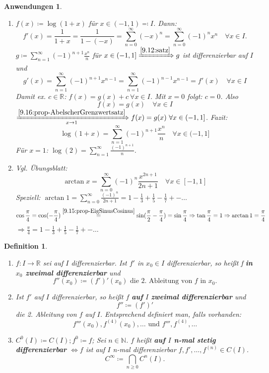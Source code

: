 \documentclass[titlepage,ngerman,a4paper,headsepline]{scrartcl}
\newcommand{\N}{\mathbb{N}}
\newcommand{\R}{\mathbb{R}}
\theoremstyle{named}
\theoremstyle{dotless}
\newtheorem{anwendungen}[namedtheorem]{Anwendungen}
\newtheorem*{definition}{Definition}
\begin{document}
\begin{anwendungen} ~\ \label{9.17:anwendungen}
	\begin{enumerate}
		\item $f(x) \coloneqq \log(1+x)$ für $x \in (-1, 1) \eqqcolon I$. Dann: \label{9.17.a:anwendungen}
			$$ f'(x) = \frac{1}{1+x} = \frac{1}{1 - (-x)} = \sum_{n=0}^{\infty} (-x)^{n} = \sum_{n=0}^{\infty} (-1)^{n} x^{n} \quad \forall x \in I. $$
			$g \coloneqq \sum_{n=1}^{\infty} (-1)^{n+1} \frac{x^{n}}{n}$ für $x \in (-1, 1] \xRightarrow[]{\ref{9.12:satz}} g$ ist differenzierbar auf $I$ und 
			$$ g'(x) = \sum_{n=1}^{\infty} (-1)^{n+1} x^{n-1} = \sum_{n=1}^{\infty} (-1)^{n-1} x^{n-1} = f'(x) \quad \forall x \in I $$
			Damit ex. $c \in \R$: $f(x) = g(x) + c ~\forall x \in I$. Mit $x = 0$ folgt: $c = 0$. Also
			$$ f(x) = g(x) \quad \forall x \in I $$
			$\xRightarrow[x \rightarrow 1]{\ref{9.16:prop-AbelscherGrenzwertsatz}} f(x) = g(x) ~\forall x \in (-1, 1]$. Fazit:
			$$ \log(1+x) = \sum_{n=1}^{\infty} (-1)^{n+1} \frac{x^{n}}{n} \quad \forall x \in (-1 , 1] $$
			Für $x = 1$: $\log(2) = \sum_{n=1}^{\infty} \frac{(-1)^{n+1}}{n}$. 
		\item Vgl. Übungsblatt: \label{9.17.b:anwendungen}
			$$ \arctan x = \sum_{n=0}^{\infty} (-1)^{n} \frac{x^{2n +1}}{2n + 1} \quad \forall x \in [-1, 1] $$
			Speziell: $\arctan 1 = \sum_{n=0}^{\infty} \frac{(-1)^{n}}{2n + 1} = 1 - \frac{1}{3} + \frac{1}{5} - \frac{1}{7} +- \dotsc$
		$$ \cos \frac{\pi}{4} = \cos(-\frac{\pi}{4}) \overset{\ref{9.15:prop-EigSinusCosinus}}{=} \sin( \frac{\pi}{2} - \frac{\pi}{4}) = \sin \frac{\pi}{4} \Rightarrow \tan \frac{\pi}{4} = 1 \Rightarrow \arctan 1 = \frac{\pi}{4} $$
		$\Rightarrow \frac{\pi}{4} = 1 - \frac{1}{3} + \frac{1}{5} - \frac{1}{7} +- \dotsc$
	\end{enumerate}
\end{anwendungen}

   
\begin{definition} ~\
	\begin{enumerate}
		\item $f \colon I \rightarrow \R$ sei auf $I$ differenzierbar. Ist $f'$ in $x_{0} \in I$ differenzierbar, so hei{\ss}t f \textbf{in $x_{0}$ zweimal differenzierbar} und
		$$ f''(x_{0}) \coloneqq (f')'(x_{0}) \text{ die 2. Ableitung von } f \text{ in } x_{0}. $$
		\item Ist $f'$ auf $I$ differenzierbar, so hei{\ss}t $f$ \textbf{auf} $I$ \textbf{zweimal differenzierbar} und
			 $$ f'' \coloneqq (f')' $$
			 die 2. Ableitung von $f$ auf $I$. Entsprechend definiert man, falls vorhanden: 
			 $$ f'''(x_{0}), f^{(4)}(x_{0}), \dotsc \text{ und } f''', f^{(4)}, \dotsc $$ 
		\item $C^{0}(I) \coloneqq C(I); f^{0} \coloneqq f$; Sei $n \in \N$. $f$ hei{\ss}t \textbf{auf $I$ n-mal stetig differenzierbar} $\iff f$ ist auf $I$ n-mal differenzierbar $f, f', \dotsc, f^{(n)} \in C(I)$.
			$$ C^{\infty} \coloneqq \bigcap_{n \geq 0} C^{n}(I). $$
	\end{enumerate}
\end{definition}
\end{document}
